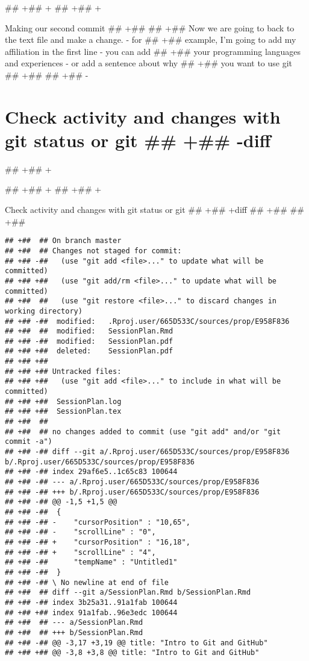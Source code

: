 \documentclass[ignorenonframetext,]{beamer}
\begin{document}
## +## +
## +## +\begin{frame}{Making our second commit}
## +##  
## +##  Now we are going to back to the text file and make a change. - for
## +##  example, I'm going to add my affiliation in the first line - you can add
## +##  your programming languages and experiences - or add a sentence about why
## +##  you want to use git
## +##  
## +## -\section{Check activity and changes with git status or git
## +## -diff}\label{check-activity-and-changes-with-git-status-or-git-diff}
## +## +\end{frame}
## +## +
## +## +\begin{frame}[fragile]{Check activity and changes with git status or git
## +## +diff}
## +##  
## +##  \begin{verbatim}
## +##  ## On branch master
## +##  ## Changes not staged for commit:
## +## -##   (use "git add <file>..." to update what will be committed)
## +## +##   (use "git add/rm <file>..." to update what will be committed)
## +##  ##   (use "git restore <file>..." to discard changes in working directory)
## +## -##  modified:   .Rproj.user/665D533C/sources/prop/E958F836
## +##  ##  modified:   SessionPlan.Rmd
## +## -##  modified:   SessionPlan.pdf
## +## +##  deleted:    SessionPlan.pdf
## +## +## 
## +## +## Untracked files:
## +## +##   (use "git add <file>..." to include in what will be committed)
## +## +##  SessionPlan.log
## +## +##  SessionPlan.tex
## +##  ## 
## +##  ## no changes added to commit (use "git add" and/or "git commit -a")
## +## -## diff --git a/.Rproj.user/665D533C/sources/prop/E958F836 b/.Rproj.user/665D533C/sources/prop/E958F836
## +## -## index 29af6e5..1c65c83 100644
## +## -## --- a/.Rproj.user/665D533C/sources/prop/E958F836
## +## -## +++ b/.Rproj.user/665D533C/sources/prop/E958F836
## +## -## @@ -1,5 +1,5 @@
## +## -##  {
## +## -## -    "cursorPosition" : "10,65",
## +## -## -    "scrollLine" : "0",
## +## -## +    "cursorPosition" : "16,18",
## +## -## +    "scrollLine" : "4",
## +## -##      "tempName" : "Untitled1"
## +## -##  }
## +## -## \ No newline at end of file
## +##  ## diff --git a/SessionPlan.Rmd b/SessionPlan.Rmd
## +## -## index 3b25a31..91a1fab 100644
## +## +## index 91a1fab..96e3edc 100644
## +##  ## --- a/SessionPlan.Rmd
## +##  ## +++ b/SessionPlan.Rmd
## +## -## @@ -3,17 +3,19 @@ title: "Intro to Git and GitHub"
## +## +## @@ -3,8 +3,8 @@ title: "Intro to Git and GitHub"

\end{verbatim}
\end{frame}
\end{document}
